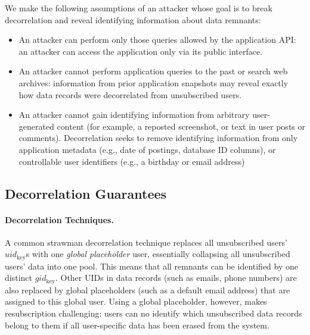 We make the following assumptions of an attacker whose goal is to break decorrelation and reveal
identifying information about data remnants:

\begin{itemize}
    \item An attacker can perform only those queries allowed by the application API: an
attacker can access the application only via its public interface. 

\item An attacker cannot perform application queries to the past or search web archives:
information from prior application snapshots may reveal 
exactly how data records were decorrelated from unsubscribed users. 

\item An attacker cannot gain identifying information from arbitrary user-generated content (for
    example, a reposted screenshot, or text in user posts or comments).  Decorrelation seeks to
        remove identifying information from only application metadata (e.g., date of postings,
        database ID columns), or controllable user identifiers (e.g., a birthday or email address)
\end{itemize}

\subsection{Decorrelation Guarantees} 
\paragraph{Decorrelation Techniques.}
A common strawman decorrelation technique replaces all unsubscribed users' $uid_\text{key}$s with
one \emph{global placeholder} user, essentially collapsing all unsubscribed users' data into one pool.
This means that all remnants can be identified by one distinct $gid_\text{key}$.
Other UIDs in data records (such as emails, phone numbers) are also replaced by global placeholders
(such as a default email address) that are assigned to this global user.
Using a global placeholder, however, makes resubscription challenging: users can no identify which unsubscribed data records belong to them if all user-specific data has been erased from the
system. 

